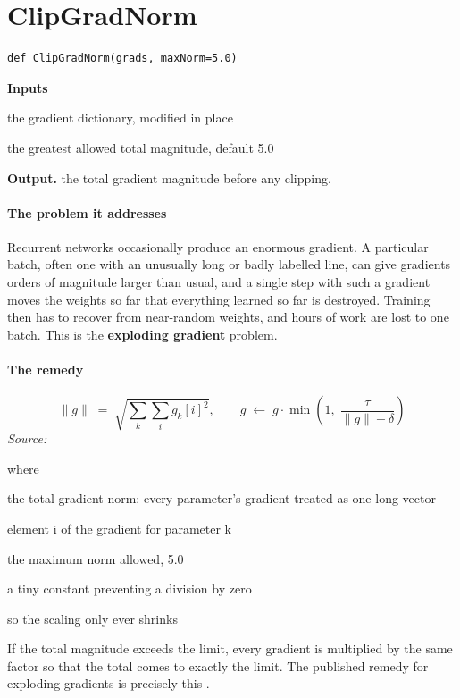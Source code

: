 \section{ClipGradNorm}
\begin{lstlisting}[style=sig]
def ClipGradNorm(grads, maxNorm=5.0)
\end{lstlisting}

\noindent\textbf{Inputs}
\begin{description}[leftmargin=2.2em,style=nextline,font=\normalfont\ttfamily]\setlength\itemsep{1pt}
  \item[{grads}] \normalfont the gradient dictionary, modified in place
  \item[{maxNorm}] \normalfont the greatest allowed total magnitude, default 5.0
\end{description}

\noindent\textbf{Output.} the total gradient magnitude before any clipping.


\paragraph{The problem it addresses}
Recurrent networks occasionally produce an enormous gradient. A particular batch, often one with an unusually long or badly labelled line, can give gradients orders of magnitude larger than usual, and a single step with such a gradient moves the weights so far that everything learned so far is destroyed. Training then has to recover from near-random weights, and hours of work are lost to one batch. This is the \textbf{exploding gradient} problem.


\paragraph{The remedy}

\begin{equation}
\|g\| \;=\; \sqrt{\sum_{k} \sum_{i} g_k[i]^2}, \qquad g \;\leftarrow\; g \cdot \min\!\left(1,\; \frac{\tau}{\|g\| + \delta}\right)
\end{equation}
\noindent\emph{Source: }\cite{pascanu2013}


\noindent where
\begin{description}[leftmargin=2.4em,style=nextline,font=\normalfont\ttfamily]\setlength\itemsep{1pt}
  \item[{$\|g\|$}] \normalfont the total gradient norm: every parameter's gradient treated as one long vector
  \item[{$g_k[i]$}] \normalfont element i of the gradient for parameter k
  \item[{$\tau$}] \normalfont the maximum norm allowed, 5.0
  \item[{$\delta$}] \normalfont a tiny constant preventing a division by zero
  \item[{$\min(1,\cdot)$}] \normalfont so the scaling only ever shrinks
\end{description}
If the total magnitude exceeds the limit, every gradient is multiplied by the same factor so that the total comes to exactly the limit. The published remedy for exploding gradients is precisely this \cite{pascanu2013}.


